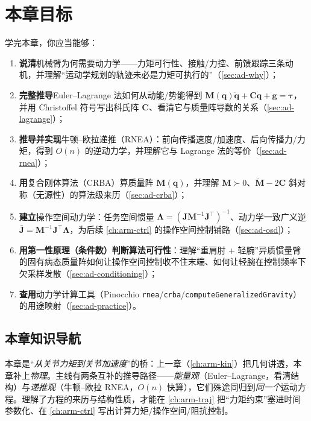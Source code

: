 \section*{本章目标}
学完本章，你应当能够：
\begin{enumerate}
  \item \textbf{说清}机械臂为何需要动力学——力矩可行性、接触/力控、前馈跟踪三条动机，并理解“运动学规划的轨迹未必是力矩可执行的”（\cref{sec:ad-why}）；
  \item \textbf{完整推导}Euler--Lagrange 法如何从动能/势能得到 $\mathbf{M}(\mathbf{q})\ddot{\mathbf{q}}+\mathbf{C}\dot{\mathbf{q}}+\mathbf{g}=\boldsymbol{\tau}$，并用 Christoffel 符号写出科氏阵 $\mathbf{C}$、看清它与质量阵导数的关系（\cref{sec:ad-lagrange}）；
  \item \textbf{推导并实现}牛顿--欧拉递推（RNEA）：前向传播速度/加速度、后向传播力/力矩，得到 $O(n)$ 的逆动力学，并理解它与 Lagrange 法的等价（\cref{sec:ad-rnea}）；
  \item \textbf{用}复合刚体算法（CRBA）算质量阵 $\mathbf{M}(\mathbf{q})$，并理解 $\mathbf{M}\succ0$、$\dot{\mathbf{M}}-2\mathbf{C}$ 斜对称（无源性）的算法级来历（\cref{sec:ad-crba}）；
  \item \textbf{建立}操作空间动力学：任务空间惯量 $\boldsymbol{\Lambda}=(\mathbf{J}\mathbf{M}^{-1}\mathbf{J}^\top)^{-1}$、动力学一致广义逆 $\bar{\mathbf{J}}=\mathbf{M}^{-1}\mathbf{J}^\top\boldsymbol{\Lambda}$，为后续 \cref{ch:arm-ctrl} 的操作空间控制铺路（\cref{sec:ad-osd}）；
  \item \textbf{用第一性原理（条件数）判断算法可行性}：理解“重肩肘 + 轻腕”异质惯量臂的固有病态质量阵如何让操作空间控制收不住末端、如何让轻腕在控制频率下欠采样发散（\cref{sec:ad-conditioning}）；
  \item \textbf{查用}动力学计算工具（Pinocchio \texttt{rnea}/\allowbreak\texttt{crba}/\allowbreak\texttt{computeGeneralizedGravity}）的用途映射（\cref{sec:ad-practice}）。
\end{enumerate}

\subsection*{本章知识导航}
本章是“\emph{从关节力矩到关节加速度}”的桥：上一章（\cref{ch:arm-kin}）把几何讲透，本章补上\emph{物理}。主线有两条互补的推导路径——\emph{能量观}（Euler--Lagrange，看清结构）与\emph{递推观}（牛顿--欧拉 RNEA，$O(n)$ 快算），它们殊途同归到\emph{同一个}运动方程。理解了方程的来历与结构性质，才能在 \cref{ch:arm-traj} 把“力矩约束”塞进时间参数化、在 \cref{ch:arm-ctrl} 写出计算力矩/操作空间/阻抗控制。


